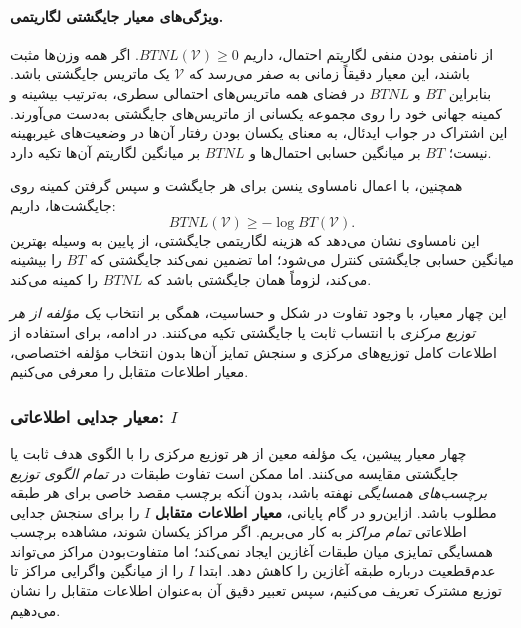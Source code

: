 \paragraph{ویژگی‌های معیار جایگشتی لگاریتمی.}
از نامنفی بودن منفی لگاریتم احتمال، داریم $BTNL(\mathcal V)\ge0$. اگر همه وزن‌ها مثبت باشند، این معیار دقیقاً زمانی به صفر می‌رسد که $\mathcal V$ یک ماتریس جایگشتی باشد. بنابراین $BT$ و $BTNL$ در فضای همه ماتریس‌های احتمالی سطری، به‌ترتیب بیشینه و کمینه جهانی خود را روی مجموعه یکسانی از ماتریس‌های جایگشتی به‌دست می‌آورند. این اشتراک در جواب ایدئال، به معنای یکسان بودن رفتار آن‌ها در وضعیت‌های غیربهینه نیست؛ $BT$ بر میانگین حسابی احتمال‌ها و $BTNL$ بر میانگین لگاریتم آن‌ها تکیه دارد.

همچنین، با اعمال نامساوی ینسن برای هر جایگشت و سپس گرفتن کمینه روی جایگشت‌ها، داریم:
\begin{equation}\label{cmp:eq:ch3-BTNL-Jensen}
\boxed{
BTNL(\mathcal V)\ge-\log BT(\mathcal V).
}
\end{equation}
این نامساوی نشان می‌دهد که هزینه لگاریتمی جایگشتی، از پایین به وسیله بهترین میانگین حسابی جایگشتی کنترل می‌شود؛ اما تضمین نمی‌کند جایگشتی که $BT$ را بیشینه می‌کند، لزوماً همان جایگشتی باشد که $BTNL$ را کمینه می‌کند.

این چهار معیار، با وجود تفاوت در شکل و حساسیت، همگی بر انتخاب \emph{یک مؤلفه از هر توزیع مرکزی} با انتساب ثابت یا جایگشتی تکیه می‌کنند. در ادامه، برای استفاده از اطلاعات کامل توزیع‌های مرکزی و سنجش تمایز آن‌ها بدون انتخاب مؤلفه اختصاصی، معیار اطلاعات متقابل را معرفی می‌کنیم.


\subsubsection{معیار جدایی اطلاعاتی: \texorpdfstring{$I$}{I}}
\label{cmp:subsubsec:ch3-I-criterion}
چهار معیار پیشین، یک مؤلفه معین
از هر توزیع مرکزی را با الگوی هدف
ثابت یا جایگشتی مقایسه می‌کنند.
اما ممکن است تفاوت طبقات
در \emph{تمام الگوی توزیع برچسب‌های همسایگی}
نهفته باشد، بدون آنکه برچسب مقصد
خاصی برای هر طبقه مطلوب باشد.
ازاین‌رو در گام پایانی،
\textbf{معیار اطلاعات متقابل} $I$
را برای سنجش جدایی اطلاعاتی
\emph{تمام مراکز} به کار می‌بریم.
اگر مراکز یکسان شوند، مشاهده
برچسب همسایگی تمایزی میان
طبقات آغازین ایجاد نمی‌کند؛
اما متفاوت‌بودن مراکز می‌تواند
عدم‌قطعیت درباره طبقه آغازین
را کاهش دهد. ابتدا $I$ را
از میانگین واگرایی مراکز تا
توزیع مشترک تعریف می‌کنیم،
سپس تعبیر دقیق آن به‌عنوان
اطلاعات متقابل را نشان می‌دهیم.

